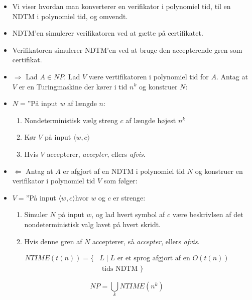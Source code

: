 \begin{frame}[allowframebreaks]
	\begin{itemize}
		\item Vi viser hvordan man konverterer en verifikator i polynomiel tid, til en NDTM i polynomiel tid, og omvendt.
		\item NDTM'en simulerer verifikatoren ved at gætte på certifikatet.
		\item Verifikatoren simulerer NDTM'en ved at bruge den accepterende gren som certifikat.
		\item \(\Rightarrow\) Lad $A \in NP$. Lad $V$ være vertifikatoren i polynomiel tid for $A$. Antag at $V$ er en Turingmaskine der kører i tid $n^{k}$ og konstruer $N$:
		\item $N =$''På input $w$ af længde $n$:
		      \begin{enumerate}
			      \item Nondeterministisk vælg streng $c$ af længde højest $n^{k}$
			      \item Kør $V$ på input $\langle w, c \rangle $
			      \item Hvis $V$ accepterer, \textit{accepter}, ellers \textit{afvis}.
		      \end{enumerate}

		\item \(\Leftarrow\) Antag at $A$ er afgjort af en NDTM i polynomiel tid $N$ og konstruer en verifikator i polynomiel tid $V$ som følger:
		\item $V = $''På input \(\langle w, c \rangle  \)hvor $w$ og $c$ er strenge:
		      \begin{enumerate}
			      \item Simuler $N$ på input $w$, og lad hvert symbol af $c$ være beskrivlsen af det nondeterministisk valg lavet på hvert skridt.
			      \item Hvis denne gren af $N$ accepterer, så \textit{accepter}, ellers \textit{afvis}.
		      \end{enumerate}
	\end{itemize}

	\begin{definition}
		\begin{align*}
			NTIME(t(n)) = \{ & L \mid L \text{ er et sprog afgjort af en } O(t(n)) \\ &\text{ tids NDTM }\}
		\end{align*}
	\end{definition}

	\begin{corollary}
		\begin{equation}
			NP = \bigcup_k NTIME(n^{k})
		\end{equation}
	\end{corollary}
\end{frame}

